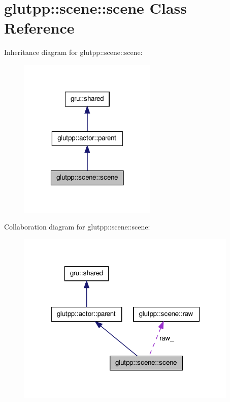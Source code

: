 \hypertarget{classglutpp_1_1scene_1_1scene}{\section{glutpp\-:\-:scene\-:\-:scene \-Class \-Reference}
\label{classglutpp_1_1scene_1_1scene}
}


\-Inheritance diagram for glutpp\-:\-:scene\-:\-:scene\-:\nopagebreak
\begin{figure}[H]
\begin{center}
\leavevmode
\includegraphics[width=186pt]{classglutpp_1_1scene_1_1scene__inherit__graph}
\end{center}
\end{figure}


\-Collaboration diagram for glutpp\-:\-:scene\-:\-:scene\-:\nopagebreak
\begin{figure}[H]
\begin{center}
\leavevmode
\includegraphics[width=298pt]{classglutpp_1_1scene_1_1scene__coll__graph}
\end{center}
\end{figure}
